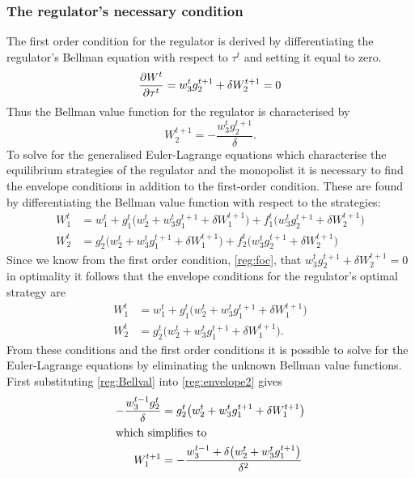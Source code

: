 \subsubsection{The regulator's necessary condition} The first order
condition for the regulator is derived by differentiating the
regulator's Bellman equation with respect to $\tau^t$ and setting it
equal to zero.
\begin{equation}    \label{reg:foc}
    \frac{\partial W^t}{\partial \tau^t} = w^t_3 g^{t+1}_2 + \delta W^{t+1}_2 = 0
\end{equation}
Thus the Bellman value function for the regulator is characterised
by
\begin{equation}    \label{reg:Bellval}
    W^{t+1}_2 = -\frac{w^t_3 g^{t+1}_2}{\delta}.
\end{equation}
To solve for the generalised Euler-Lagrange equations which
characterise the equilibrium strategies of the regulator and the
monopolist it is necessary to find the envelope conditions in
addition to the first-order condition. These are found by
differentiating the Bellman value function with respect to the
strategies:
\begin{align}
    W^t_1 &= w^t_1 + g^t_1 \bigl( w^t_2 + w^t_3 g^{t+1}_1 + \delta
    W^{t+1}_1 \bigr) + f^t_1 \bigl( w^t_3 g^{t+1}_2 + \delta
    W^{t+1}_2 \bigr) \\
    W^t_2 &= g^t_2 \bigl( w^t_2 + w^t_3 g^{t+1}_1 + \delta W^{t+1}_1
    \bigr) + f^t_2 \bigl( w^t_3 g^{t+1}_2 + \delta
    W^{t+1}_2 \bigr)
\end{align}
Since we know from the first order condition, \eqref{reg:foc}, that
$w^t_3 g^{t+1}_2 + \delta W^{t+1}_2 = 0$ in optimality it follows
that the envelope conditions for the regulator's optimal strategy
are
\begin{align}
    W^t_1 &= w^t_1 + g^t_1 \bigl( w^t_2 + w^t_3 g^{t+1}_1 + \delta
    W^{t+1}_1 \bigr)    \label{reg:envelope1} \\
    W^t_2 &= g^t_2 \bigl( w^t_2 + w^t_3 g^{t+1}_1 + \delta W^{t+1}_1
    \bigr).     \label{reg:envelope2}
\end{align}
From these conditions and the first order conditions it is possible
to solve for the Euler-Lagrange equations  by eliminating the
unknown Bellman value functions. First substituting
\eqref{reg:Bellval} into \eqref{reg:envelope2} gives
\begin{align}
    -\frac{w^{t-1}_3 g^t_2}{\delta} &= g^t_2 \bigl( w^t_2 + w^t_3 g^{t+1}_1 + \delta W^{t+1}_1
    \bigr) \\
    \intertext{which simplifies to}
    W^{t+1}_1 &= -\frac{w^{t-1}_3 + \delta \bigl( w^t_2 + w^t_3 g^{t+1}_1 \bigr) }{\delta^2}
    \label{reg:dWt+1dpt}
\end{align}
